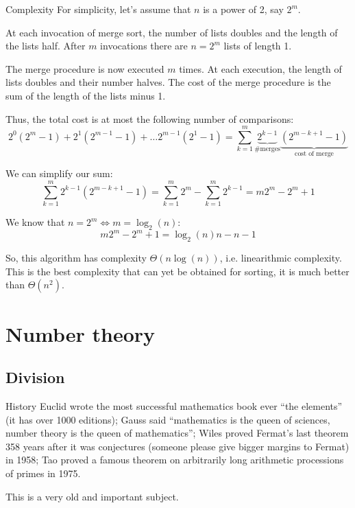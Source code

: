 \documentclass[a4paper]{article}
\begin{document}
\begin{parag}{Complexity}
    For simplicity, let's assume that $n$ is a power of 2, say $2^m$.

    At each invocation of merge sort, the number of lists doubles and the length of the lists half. After $m$ invocations there are $n = 2^m$ lists of length 1.

    The merge procedure is now executed $m$ times. At each execution, the length of lists doubles and their number halves. The cost of the merge procedure is the sum of the length of the lists minus 1.

    Thus, the total cost is at most the following number of comparisons: 
    \[2^0\left(2^m - 1\right) + 2^1\left(2^{m-1} - 1\right) + \ldots 2^{m-1}\left(2^1 - 1\right) = \sum_{k=1}^{m} \underbrace{2^{k-1}}_{\text{\# merges}} \underbrace{\left(2^{m-k+1} - 1\right)}_{\text{cost of merge}}\]
    
    We can simplify our sum: 
    \[\sum_{k=1}^{m} 2^{k-1}\left(2^{m-k+1} - 1\right) = \sum_{k=1}^{m} 2^{m} - \sum_{k=1}^{m} 2^{k-1} = m2^m - 2^m + 1\]
    
    We know that $n = 2^m \iff m = \log_2\left(n\right)$: 
    \[m2^m - 2^m + 1 = \log_2\left(n\right)n - n - 1\]
    
    So, this algorithm has complexity $\Theta\left(n\log\left(n\right)\right)$, i.e. linearithmic complexity. This is the best complexity that can yet be obtained for sorting, it is much better than $\Theta\left(n^2\right)$.
\end{parag}

\section{Number theory}
\subsection{Division}
\begin{parag}{History}
    Euclid wrote the most successful mathematics book ever ``the elements'' (it has over 1000 editions); Gauss said ``mathematics is the queen of sciences, number theory is the queen of mathematics''; Wiles proved Fermat's last theorem 358 years after it was conjectures (someone please give bigger margins to Fermat) in 1958; Tao proved a famous theorem on arbitrarily long arithmetic processions of primes in 1975.

    This is a very old and important subject.
\end{parag}
\end{document}
